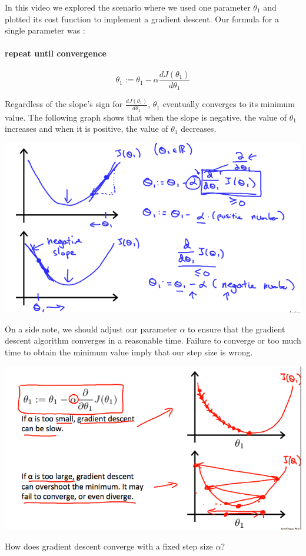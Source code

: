 \documentclass[UTF8]{article}
\begin{document}
In this video we explored the scenario where we used one parameter $\theta_1$ and plotted its cost function to implement a gradient descent. Our formula for a single parameter was :

\paragraph{repeat until convergence}

\[ \theta_1:=\theta_1-\alpha\frac{dJ(\theta_1)}{d\theta_1} \]

Regardless of the slope's sign for $\frac{dJ(\theta_1)}{d\theta_1}$, $\theta_1$ eventually converges to its minimum value. The following graph shows that when the slope is negative, the value of $\theta_1$ increases and when it is positive, the value of $\theta_1$ decreases.

\includegraphics[width = .8\textwidth]{NotePics/2_3_1_1.png}

On a side note, we should adjust our parameter $\alpha$ to ensure that the gradient descent algorithm converges in a reasonable time. Failure to converge or too much time to obtain the minimum value imply that our step size is wrong.

\includegraphics[width = .8\textwidth]{NotePics/2_3_1_2.png}

How does gradient descent converge with a fixed step size $\alpha$?
\end{document}
